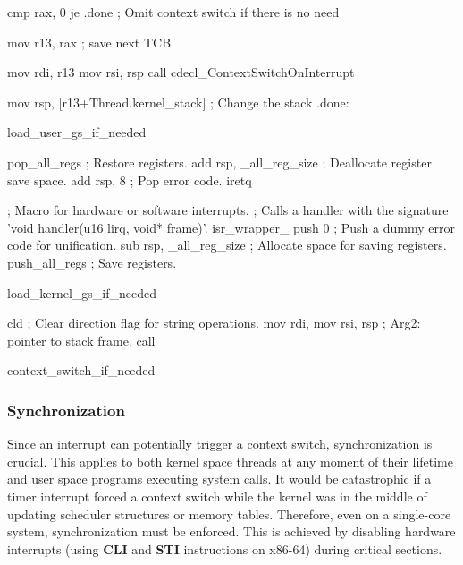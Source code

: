 \documentclass[a4paper,10pt,twoside]{report}
\theoremstyle{definition}
\begin{document}
\clearpage

\begin{nasmcode}[caption={Assembly ISR wrapper}, label={lst:isr_asm}]
  cmp rax, 0
  je .done                         ; Omit context switch if there is no need

  mov r13, rax                     ; save next TCB

  mov rdi, r13
  mov rsi, rsp
  call cdecl_ContextSwitchOnInterrupt

  mov rsp, [r13+Thread.kernel_stack]   ; Change the stack
.done:

  load_user_gs_if_needed

  pop_all_regs                    ; Restore registers.
  add rsp, _all_reg_size          ; Deallocate register save space.
  add rsp, 8                      ; Pop error code.
  iretq

; Macro for hardware or software interrupts.
; Calls a handler with the signature 'void handler(u16 lirq, void* frame)'.
isr_wrapper_%
    push 0                          ; Push a dummy error code for unification.
    sub rsp, _all_reg_size          ; Allocate space for saving registers.
    push_all_regs                   ; Save registers.

    load_kernel_gs_if_needed

    cld                         ; Clear direction flag for string operations.
    mov rdi, %
    mov rsi, rsp                ; Arg2: pointer to stack frame.
    call %

    context_switch_if_needed
\end{nasmcode}

\subsubsection{Synchronization}

Since an interrupt can potentially trigger a context switch, synchronization is crucial. This applies to both kernel space threads at any moment of their lifetime and user space programs executing system calls. It would be catastrophic if a timer interrupt forced a context switch while the kernel was in the middle of updating scheduler structures or memory tables. Therefore, even on a single-core system, synchronization must be enforced. This is achieved by disabling hardware interrupts (using \textbf{CLI} and \textbf{STI} instructions on x86-64) during critical sections.
\end{document}
